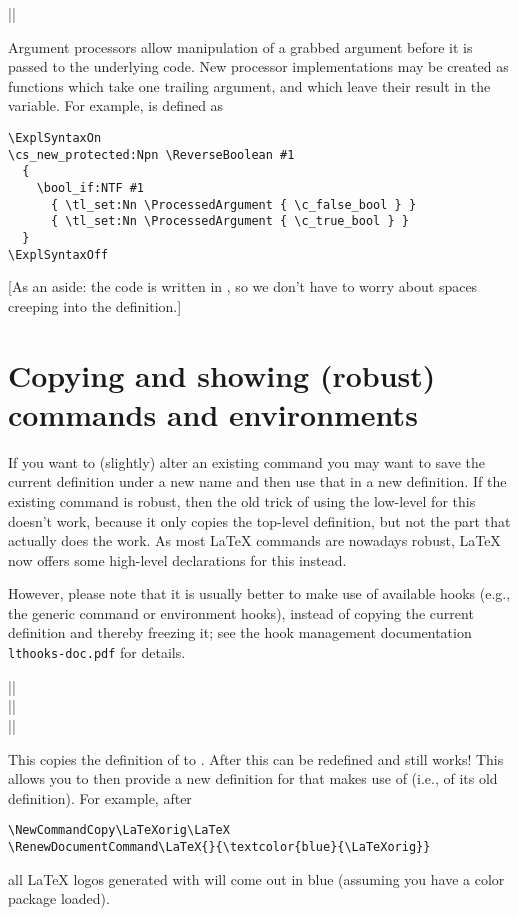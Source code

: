 \documentclass{ltxguide}
\begin{document}
\begin{decl}
  |\ProcessedArgument|
\end{decl}
Argument processors allow manipulation of a grabbed argument before it is
passed to the underlying code. New processor implementations may be created
as functions which take one trailing argument, and which leave their result in
the  variable. For example,  is
defined as
\begin{verbatim}
\ExplSyntaxOn
\cs_new_protected:Npn \ReverseBoolean #1
  {
    \bool_if:NTF #1
      { \tl_set:Nn \ProcessedArgument { \c_false_bool } }
      { \tl_set:Nn \ProcessedArgument { \c_true_bool } }
  }
\ExplSyntaxOff
\end{verbatim}
[As an aside: the code is written in , so we don't have to
  worry about spaces creeping into the definition.]

\section{Copying and showing (robust) commands and environments}

If you want to (slightly) alter an existing command you may want to
save the current definition under a new name and then use that in a
new definition. If the existing command is robust, then the old trick of
using the low-level  for this doesn't work, because it only
copies the top-level definition, but not the part that actually does
the work. As most \LaTeX{} commands are nowadays robust, \LaTeX{}
now offers some high-level declarations for this instead.

However, please note that it is usually better to make use of
available hooks (e.g., the generic command or environment hooks),
instead of copying the current definition and thereby freezing it; see
the hook management documentation \texttt{lthooks-doc.pdf} for
details.

\begin{decl}
  |\NewCommandCopy|         \\
  |\RenewCommandCopy|       \\
  |\DeclareCommandCopy|    
\end{decl}

This copies the definition of  to . After
this  can be redefined and 
still works! This allows you to then provide a new definition for
 that makes use of  (i.e., of its old
definition). For example, after
\begin{verbatim}
\NewCommandCopy\LaTeXorig\LaTeX
\RenewDocumentCommand\LaTeX{}{\textcolor{blue}{\LaTeXorig}}
\end{verbatim}
all \LaTeX{} logos generated with  will come out in blue
(assuming you have a color package loaded).
\end{document}
